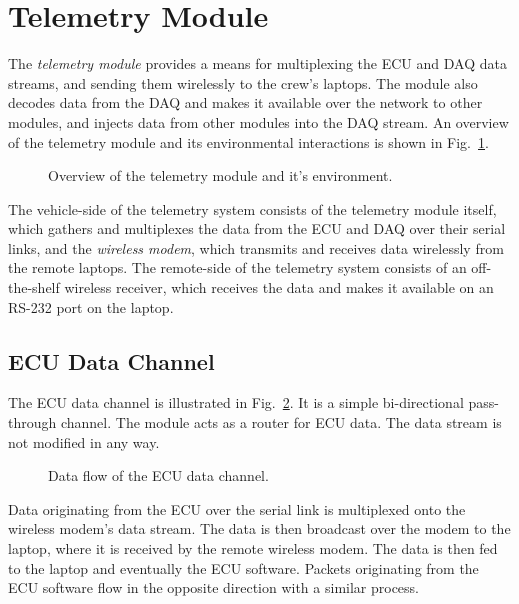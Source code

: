 \section{Telemetry Module\label{sec:Telemetry-Module-Design}}

The \emph{telemetry module} provides a means for multiplexing the ECU and DAQ data streams, and sending them wirelessly to the crew's laptops. The module also decodes data from the DAQ and makes it available over the network to other modules, and injects data from other modules into the DAQ stream. An overview of the telemetry module and its environmental interactions is shown in Fig.\ \ref{fig:design_telemetry_overview_block}.

\begin{figure}[H]
	\centering
	
	\caption{Overview of the telemetry module and it's environment.}
	\label{fig:design_telemetry_overview_block}
\end{figure}

The vehicle-side of the telemetry system consists of the telemetry module itself, which gathers and multiplexes the data from the ECU and DAQ over their serial links, and the \emph{wireless modem}, which transmits and receives data wirelessly from the remote laptops. The remote-side of the telemetry system consists of an off-the-shelf wireless receiver, which receives the data and makes it available on an RS-232 port on the laptop.

\subsection{ECU Data Channel}

The ECU data channel is illustrated in Fig.\ \ref{fig:ecu_data_channel}. It is a simple bi-directional pass-through channel. The module acts as a router for ECU data. The data stream is not modified in any way. 

\begin{figure}[H]
	\centering
	
	\caption{Data flow of the ECU data channel.}
	\label{fig:ecu_data_channel}
\end{figure}

Data originating from the ECU over the serial link is multiplexed onto the wireless modem's data stream. The data is then broadcast over the modem to the laptop, where it is received by the remote wireless modem. The data is then fed to the laptop and eventually the ECU software. Packets originating from the ECU software flow in the opposite direction with a similar process.

